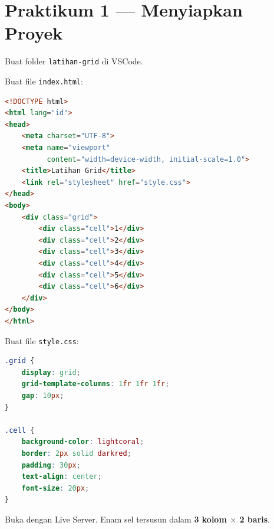 \section{Praktikum 1 --- Menyiapkan Proyek}
\label{sec:grid-praktik-1}

\begin{langkah}
  \item Buat folder \texttt{latihan-grid} di VSCode.
  \item Buat file \texttt{index.html}:
\end{langkah}

\begin{lstlisting}[language=HTML, caption={Struktur index.html}, label={lst:grid-index}]
<!DOCTYPE html>
<html lang="id">
<head>
    <meta charset="UTF-8">
    <meta name="viewport"
          content="width=device-width, initial-scale=1.0">
    <title>Latihan Grid</title>
    <link rel="stylesheet" href="style.css">
</head>
<body>
    <div class="grid">
        <div class="cell">1</div>
        <div class="cell">2</div>
        <div class="cell">3</div>
        <div class="cell">4</div>
        <div class="cell">5</div>
        <div class="cell">6</div>
    </div>
</body>
</html>
\end{lstlisting}

\begin{langkah}
  \item Buat file \texttt{style.css}:
\end{langkah}

\begin{lstlisting}[language=CSS, caption={Grid tiga kolom}, label={lst:grid-style}]
.grid {
    display: grid;
    grid-template-columns: 1fr 1fr 1fr;
    gap: 10px;
}

.cell {
    background-color: lightcoral;
    border: 2px solid darkred;
    padding: 30px;
    text-align: center;
    font-size: 20px;
}
\end{lstlisting}

\begin{langkah}
  \item Buka dengan Live Server. Enam sel tersusun dalam \textbf{3 kolom $\times$ 2 baris}.
\end{langkah}

